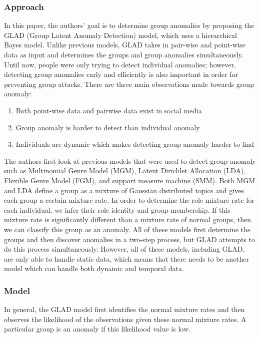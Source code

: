 \documentclass[11pt, oneside]{article}   	%
\begin{document}
\subsubsection*{Approach}

\quad In this paper, the authors' goal is to determine group anomalies by proposing the GLAD (Group Latent Anomaly Detection) model, which uses a hierarchical Bayes model.
Unlike previous models, GLAD takes in pair-wise and point-wise data as input and determines the groups and group anomalies simultaneously.
Until now, people were only trying to detect individual anomalies; however, detecting group anomalies early and efficiently is also important in order for preventing group attacks.
There are three main observations made towards group anomaly:
\begin{enumerate}
	\item Both point-wise data and pairwise data exist in social media
	\item Group anomaly is harder to detect than individual anomaly
	\item Individuals are dynamic which makes detecting group anomaly harder to find
\end{enumerate}

\quad The authors first look at previous models that were used to detect group anomaly such as Multinomial Genre Model (MGM), Latent Dirichlet Allocation (LDA), Flexible Genre Model (FGM), and support measure machine (SMM).
Both MGM and LDA define a group as a mixture of Gaussian distributed topics and gives each group a certain mixture rate.
In order to determine the role mixture rate for each individual, we infer their role identity and group membership.
If this mixture rate is significantly different than a mixture rate of normal groups, then we can classify this group as an anomaly.
All of these models first determine the groups and then discover anomalies in a two-step process, but GLAD attempts to do this process simultaneously.
However, all of these models, including GLAD, are only able to handle static data, which means that there needs to be another model which can handle both dynamic and temporal data.

\subsubsection*{Model}

\quad In general, the GLAD model first identifies the normal mixture rates and then observes the likelihood of the observations given these normal mixture rates.
A particular group is an anomaly if this likelihood value is low.
\end{document}
